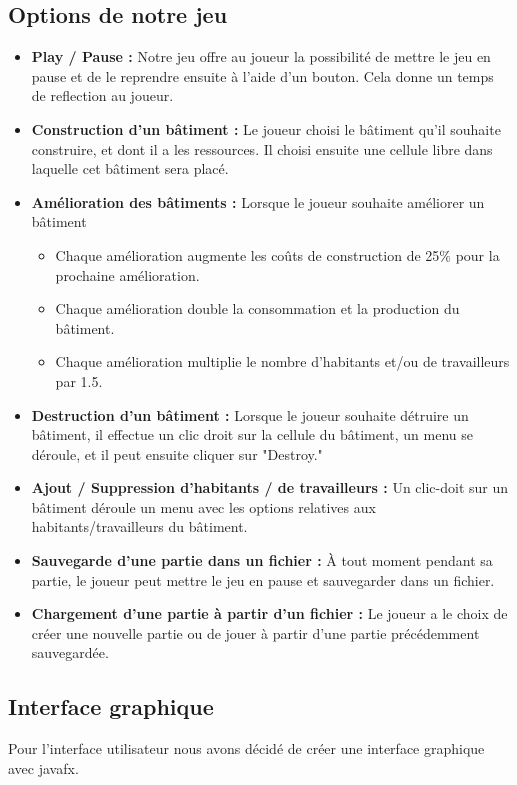\documentclass[a4paper,11pt]{article}
\begin{document}
\subsection{Options de notre jeu}
\begin{itemize}
	\item \textbf{Play / Pause : } Notre jeu offre au joueur la possibilité de mettre le jeu en pause et de le reprendre ensuite à l'aide d'un bouton. Cela donne un temps de reflection au joueur.

	\item \textbf{Construction d'un bâtiment : } Le joueur choisi le bâtiment qu'il souhaite construire, et dont il a les ressources. Il choisi ensuite une cellule libre dans laquelle cet bâtiment sera placé.

	\item \textbf{Amélioration des bâtiments : } Lorsque le joueur souhaite améliorer un bâtiment
	      \begin{itemize}
		      \item Chaque amélioration augmente les coûts de construction de 25\% pour la prochaine amélioration.
		      \item Chaque amélioration double la consommation et la production du bâtiment.
		      \item Chaque amélioration multiplie le nombre d'habitants et/ou de travailleurs par 1.5.
	      \end{itemize}
	\item \textbf{Destruction d'un bâtiment : } Lorsque le joueur souhaite détruire un bâtiment, il effectue un clic droit sur la cellule du bâtiment, un menu se déroule, et il peut ensuite cliquer sur "Destroy."

	\item \textbf{Ajout / Suppression d'habitants / de travailleurs : } Un clic-doit sur un bâtiment déroule un menu avec les options relatives aux habitants/travailleurs du bâtiment.

	\item \textbf{Sauvegarde d'une partie dans un fichier : } À tout moment pendant sa partie, le joueur peut mettre le jeu en pause et sauvegarder dans un fichier.

	\item \textbf{Chargement d'une partie à partir d'un fichier : } Le joueur a le choix de créer une nouvelle partie ou de jouer à partir d'une partie précédemment sauvegardée.
\end{itemize}


\subsection{Interface graphique}
Pour l'interface utilisateur nous avons décidé de créer une interface graphique avec javafx.
\end{document}
